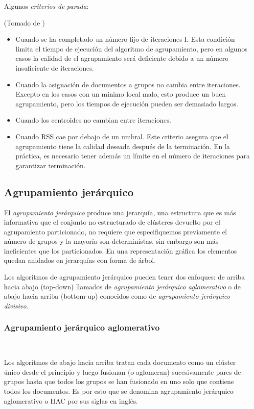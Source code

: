 \documentclass{llncs}
\begin{document}
Algunos \textit{criterios de parada}:
\begin{flushright}
	\scriptsize*(Tomado de \cite{B1})
	\normalsize
\end{flushright}
\begin{itemize}
	\item Cuando se ha completado un número fijo de iteraciones I. Esta condición limita el tiempo de ejecución del algoritmo de agrupamiento, pero en algunos casos la calidad de el agrupamiento será deficiente debido a un número insuficiente de iteraciones.
	\item Cuando la asignación de documentos a grupos no cambia entre iteraciones. Excepto en los casos con un m\'inimo local malo, esto produce un buen agrupamiento, pero los tiempos de ejecución pueden ser demasiado largos.
	\item Cuando los centroides no cambian entre iteraciones.
	\item Cuando RSS cae por debajo de un umbral. Este criterio asegura que el agrupamiento tiene la calidad deseada después de la terminación. En la práctica, es necesario tener adem\'as un límite en el número de iteraciones para garantizar terminación.
\end{itemize}

\subsection{Agrupamiento jer\'arquico}

El \textit{agrupamiento jerárquico} produce una jerarquía, una estructura que es más informativa que el conjunto no estructurado de clústeres devuelto por el agrupamiento particionado, no requiere que especifiquemos previamente el número de grupos y la mayoría son deterministas, sin embargo son m\'as ineficientes que los particionados. En una representación gráfica los elementos quedan anidados en jerarquías con forma de árbol.

Los algoritmos de agrupamiento jerárquico pueden tener dos enfoques: de arriba hacia abajo (top-down) llamados de \textit{agrupamiento jer\'arquico aglomerativo} o de abajo hacia arriba (bottom-up) conocidos como de \textit{agrupamiento jer\'arquico divisivo}. 

\subsubsection{Agrupamiento jer\'arquico aglomerativo}
\textcolor{white}{.}

\vspace{0.5em}
Los algoritmos de abajo hacia arriba tratan cada documento como un clúster único desde el principio y luego fusionan (o aglomeran) sucesivamente pares de grupos hasta que todos los grupos se han fusionado en uno solo que contiene todos los documentos. 
Es por esto que se denomina agrupamiento jerárquico aglomerativo o HAC por sus siglas en ingl\'es. 
\end{document}
